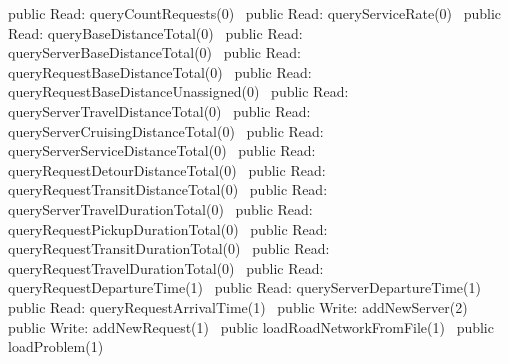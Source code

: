 public \LA{}Read: queryCountRequests(0)~{\nwtagstyle{}}\RA{}
public \LA{}Read: queryServiceRate(0)~{\nwtagstyle{}}\RA{}
public \LA{}Read: queryBaseDistanceTotal(0)~{\nwtagstyle{}}\RA{}
public \LA{}Read: queryServerBaseDistanceTotal(0)~{\nwtagstyle{}}\RA{}
public \LA{}Read: queryRequestBaseDistanceTotal(0)~{\nwtagstyle{}}\RA{}
public \LA{}Read: queryRequestBaseDistanceUnassigned(0)~{\nwtagstyle{}}\RA{}
public \LA{}Read: queryServerTravelDistanceTotal(0)~{\nwtagstyle{}}\RA{}
public \LA{}Read: queryServerCruisingDistanceTotal(0)~{\nwtagstyle{}}\RA{}
public \LA{}Read: queryServerServiceDistanceTotal(0)~{\nwtagstyle{}}\RA{}
public \LA{}Read: queryRequestDetourDistanceTotal(0)~{\nwtagstyle{}}\RA{}
public \LA{}Read: queryRequestTransitDistanceTotal(0)~{\nwtagstyle{}}\RA{}
public \LA{}Read: queryServerTravelDurationTotal(0)~{\nwtagstyle{}}\RA{}
public \LA{}Read: queryRequestPickupDurationTotal(0)~{\nwtagstyle{}}\RA{}
public \LA{}Read: queryRequestTransitDurationTotal(0)~{\nwtagstyle{}}\RA{}
public \LA{}Read: queryRequestTravelDurationTotal(0)~{\nwtagstyle{}}\RA{}
public \LA{}Read: queryRequestDepartureTime(1)~{\nwtagstyle{}}\RA{}
public \LA{}Read: queryServerDepartureTime(1)~{\nwtagstyle{}}\RA{}
public \LA{}Read: queryRequestArrivalTime(1)~{\nwtagstyle{}}\RA{}
\nwendcode{}\nwdocspar
{}
\nwenddocs{}\plusendmoddef
public \LA{}Write: addNewServer(2)~{\nwtagstyle{}}\RA{}
public \LA{}Write: addNewRequest(1)~{\nwtagstyle{}}\RA{}
public \LA{}loadRoadNetworkFromFile(1)~{\nwtagstyle{}}\RA{}
public \LA{}loadProblem(1)~{\nwtagstyle{}}\RA{}
\nwendcode{}\nwdocspar
{}
\nwenddocs{}\plusendmoddef
